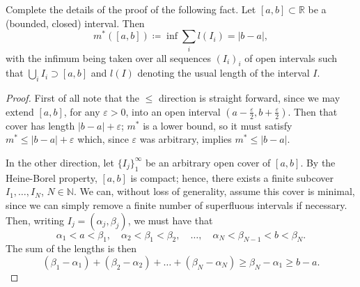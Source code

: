 \documentclass[12pt]{article}
\newenvironment{problem}[2][Problem]{\begin{trivlist}
    \item[\hskip \labelsep {\bfseries #1}\hskip \labelsep {\bfseries #2.}]}{\end{trivlist}}
\theoremstyle{definition}
\begin{document}
\begin{problem}{from class}
  Complete the details of the proof of the following fact.
  Let \( [a,b] \subset \mathbb{R} \) be a (bounded, closed) interval.
  Then
  \begin{equation}
  \label{eq:1}
  m^{*}([a,b]) \coloneq \inf \sum\limits_i l(I_i) = |b-a|,
  \end{equation}
  with the infimum being taken over all sequences \( (I_i)_i \) of open intervals such that \( \bigcup_i I_i \supset [a,b] \) and \( l(I) \) denoting the usual length of the interval \( I \).
\end{problem}
\begin{proof}
  First of all note that the \( \leq \) direction is straight forward, since we may extend \( [a,b] \), for any \(\varepsilon>0\), into an open interval \( (a - \frac{\varepsilon}{2}, b + \frac{\varepsilon}{2}) \).
  Then that cover has length \( |b-a| + \varepsilon \); \( m^{*} \) is a lower bound, so it must satisfy \( m^{*} \leq |b-a| + \varepsilon \) which, since \(\varepsilon\) was arbitrary, implies \( m^{*} \leq |b-a| \).

  In the other direction, let \( \{ I_j \}_1^{\infty} \) be an arbitrary open cover of \( [a,b] \).
  By the Heine-Borel property, \( [a,b] \) is compact; hence, there exists a finite subcover \( {I_1, \dots, I_N}\), \( N \in \mathbb{N} \).
  We can, without loss of generality, assume this cover is minimal, since we can simply remove a finite number of superfluous intervals if necessary.
  Then, writing \( I_j = (\alpha_j, \beta_j) \), we must have that
  \begin{equation}
  \label{eq:2}
  \alpha_1 < a < \beta_1, \quad \alpha_2 < \beta_1 < \beta_2, \quad \dots, \quad \alpha_N < \beta_{N-1} < b < \beta_N.
  \end{equation}
  The sum of the lengths is then
  \begin{equation}
  \label{eq:3}
  (\beta_1 - \alpha_1) + (\beta_2 - \alpha_2) + \dots + (\beta_N - \alpha_N) \geq \beta_N - \alpha_1 \geq b-a.
  \end{equation}
\end{proof}
\end{document}
